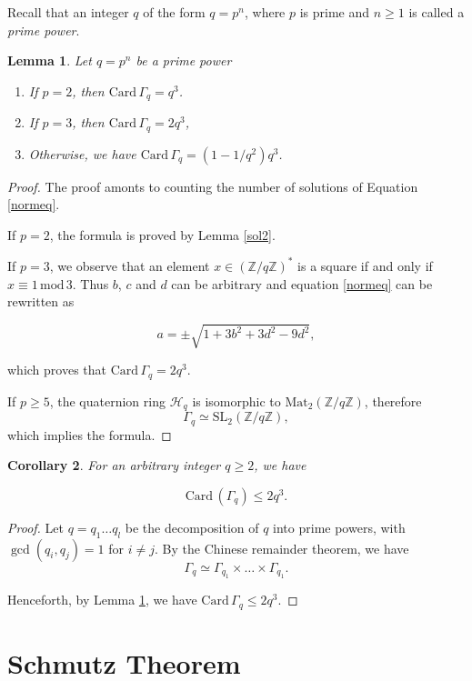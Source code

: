 \documentclass[12pt]{amsart}
\newcommand{\Z}{\mathbb{Z}}
\newcommand{\Card}{\mathrm{Card\,}}
\newcommand{\Mat}{\mathrm{Mat}}
\newcommand{\SL}{{\mathrm {SL}}}
\renewcommand{\mod}{\,\mathrm{mod}\,}
\newtheorem{lemma}{Lemma}
\newtheorem{cor}[lemma]{Corollary}
\newcommand{\cH}{\mathcal{H}}
\begin{document}
Recall that an integer $q$ of the form $q=p^n$, where 
$p$ is prime and $n\geq 1$ is called a
{\it prime power}.


\begin{lemma}\label{solq} Let $q=p^n$ be a prime power

\begin{enumerate}
\item[(a)] If $p=2$, then $\Card \Gamma_q=q^3$.
\item[(b)] If $p=3$, then $\Card \Gamma_q=2q^3$,
\item[(c)] Otherwise, we have 
$\Card \Gamma_q=(1-1/q^2) q^3$.
\end{enumerate}

\end{lemma}


\begin{proof}  The proof amonts to counting 
the number of solutions of Equation \ref{normeq}.

If $p=2$, the formula is proved by Lemma \ref{sol2}.

If $p=3$, we observe that an element
$x\in (\Z/q\Z)^*$ is a square if and only if
$x\equiv 1\mod 3$. Thus $b$, $c$ and $d$ can be arbitrary
and equation
\ref{normeq}  can be rewritten as

$$a=\pm\sqrt{1+3b^2+3d^2-9d^2},$$

\noindent which proves that $\Card \Gamma_q=2q^3$.

If $p\geq 5$, the quaternion ring $\cH_q$ is isomorphic to
$\Mat_2(\Z/q\Z)$, therefore 
$$\Gamma_q\simeq \SL_2(\Z/q\Z),$$
which implies the formula.
\end{proof}

\begin{cor}\label{corcardinal} For an arbitrary integer $q\geq 2$, we have

$$\Card (\Gamma_q)\leq 2 q^3.$$
\end{cor}

\begin{proof} Let $q=q_1\ldots q_l$
be the decomposition of $q$ into prime powers, with
$\gcd(q_i,q_j)=1$ for $i\neq j$.
By the Chinese remainder theorem, we have
$$\Gamma_q\simeq \Gamma_{q_1}\times\ldots\times \Gamma_{q_1}.$$

\noindent Henceforth, by Lemma \ref{solq}, we have
$\Card  \Gamma_q\leq 2 q^3$. 
\end{proof}


\section{Schmutz Theorem}
\end{document}
